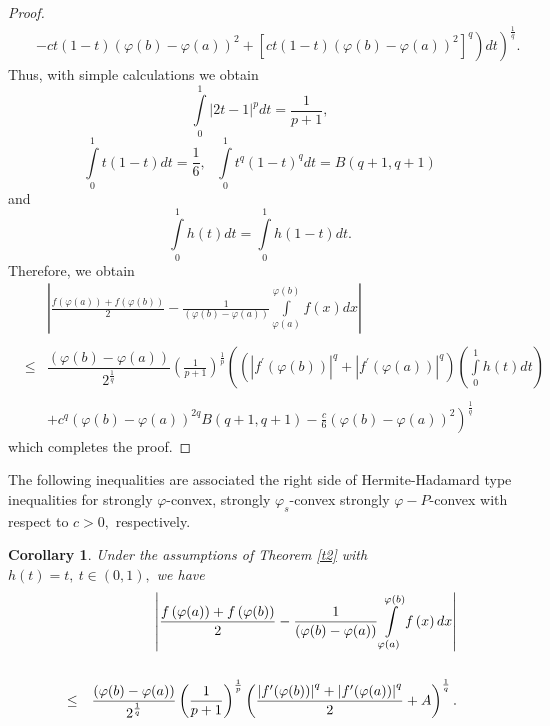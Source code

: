 \documentclass{amsart}
\theoremstyle{plain}
\newtheorem{corollary}{Corollary}
\numberwithin{equation}{section}
\begin{document}
\begin{proof}
\begin{eqnarray*}
&&\left. -\left. ct(1-t)(\varphi (b)-\varphi (a))^{2}+\left[ ct(1-t)(\varphi
(b)-\varphi (a))^{2}\right] ^{q}\right) dt\right) ^{\frac{1}{q}}.
\end{eqnarray*}Thus, with simple calculations we obtain\begin{equation*}
\int\limits_{0}^{1}\left\vert 2t-1\right\vert ^{p}dt=\frac{1}{p+1},
\end{equation*}\begin{equation*}
\int\limits_{0}^{1}t(1-t)dt=\frac{1}{6},\ \ \
\int\limits_{0}^{1}t^{q}(1-t)^{q}dt=B(q+1,q+1)
\end{equation*}and\begin{equation*}
\int\limits_{0}^{1}h(t)dt=\int\limits_{0}^{1}h(1-t)dt.
\end{equation*}Therefore, we obtain\begin{eqnarray*}
&&\left\vert \frac{f\left( \varphi (a)\right) +f\left( \varphi (b)\right) }{2}-\frac{1}{(\varphi (b)-\varphi (a))}\int\limits_{\varphi (a)}^{\varphi
(b)}f\left( x\right) dx\right\vert  \\
&& \\
&\leq &\dfrac{(\varphi (b)-\varphi (a))}{2^{\frac{1}{q}}}\left( \frac{1}{p+1}\right) ^{\frac{1}{p}}\left( \left( \left\vert f^{\prime }(\varphi
(b))\right\vert ^{q}+\left\vert f^{\prime }(\varphi (a))\right\vert
^{q}\right) \left( \int\limits_{0}^{1}h(t)dt\right) \right.  \\
&& \\
&&+\left. c^{q}(\varphi (b)-\varphi (a))^{2q}B(q+1,q+1)-\frac{c}{6}(\varphi
(b)-\varphi (a))^{2}\right) ^{\frac{1}{q}}
\end{eqnarray*}which completes the proof.
\end{proof}

The following inequalities are associated the right side of Hermite-Hadamard
type inequalities for strongly $\varphi $-convex, strongly $\varphi _{s}$-convex strongly $\varphi -P$-convex with respect to $c>0,$ respectively.

\begin{corollary}
Under the assumptions of Theorem \ref{t2} with $h(t)=t,\ t\in \left(
0,1\right) ,$ we have\begin{eqnarray}
&&\left\vert \frac{f\left( \varphi (a)\right) +f\left( \varphi (b)\right) }{2}-\frac{1}{(\varphi (b)-\varphi (a))}\int\limits_{\varphi (a)}^{\varphi
(b)}f\left( x\right) dx\right\vert   \label{k1} \\
&&  \notag \\
&\leq &\dfrac{(\varphi (b)-\varphi (a))}{2^{\frac{1}{q}}}\left( \frac{1}{p+1}\right) ^{\frac{1}{p}}\left( \frac{\left\vert f^{\prime }(\varphi
(b))\right\vert ^{q}+\left\vert f^{\prime }(\varphi (a))\right\vert ^{q}}{2}+A\right) ^{\frac{1}{q}}.  \notag
\end{eqnarray}
\end{corollary}
\end{document}
